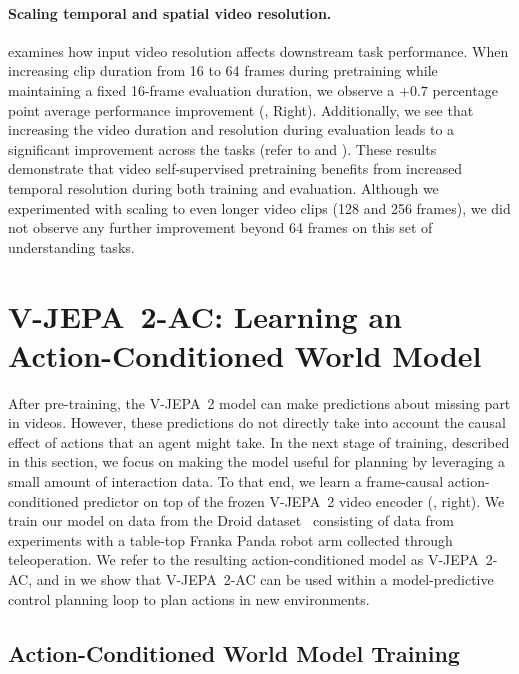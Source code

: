 \documentclass[]{fairmeta}
\newcommand{\model}{V-JEPA~2\xspace}
\newcommand{\acModel}{V-JEPA~2-AC\xspace}
\begin{document}
\paragraph{\bf Scaling temporal and spatial video resolution.}
 examines how input video resolution affects downstream task performance. When increasing clip duration from 16 to 64 frames during pretraining while maintaining a fixed 16-frame evaluation duration, we observe a $+0.7$ percentage point average performance improvement (,  Right). Additionally, we see that increasing the video duration and resolution during evaluation leads to a significant improvement across the tasks (refer to  and ).
These results demonstrate that video self-supervised pretraining benefits from increased temporal resolution during both training and evaluation. Although we experimented with scaling to even longer video clips (128 and 256 frames), we did not observe any further improvement beyond 64 frames on this set of understanding tasks. 

\section{\acModel: Learning an Action-Conditioned World Model}
\label{section:stage2}

After pre-training, the \model model can make predictions about missing part in videos. However, these predictions do not directly take into account the causal effect of actions that an agent might take.
In the next stage of training, described in this section, we focus on making the model useful for planning by leveraging a small amount of interaction data.
To that end, we learn a frame-causal action-conditioned predictor on top of the frozen \model video encoder (, right). We train our model on data from the Droid dataset~\citep{khazatsky2024droid} consisting of data from experiments with a table-top Franka Panda robot arm collected through teleoperation. We refer to the resulting action-conditioned model as \acModel, and in  we show that \acModel can be used within a model-predictive control planning loop to plan actions in new environments.



\subsection{Action-Conditioned World Model Training}
\end{document}
